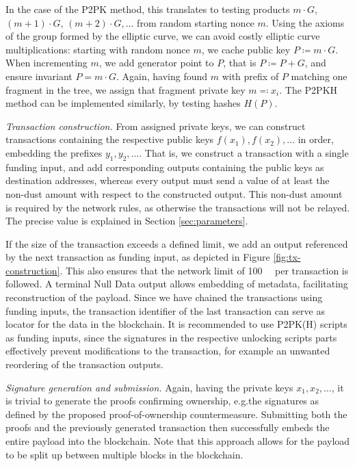 \documentclass[a4paper,11pt,titlepage]{scrbook}
\begin{document}
In the case of the P2PK method, this translates to testing products $m\cdot G$, $(m{+}1)\cdot G$, $(m{+}2)\cdot G,\dots$ from random starting nonce $m$.
Using the axioms of the group formed by the elliptic curve, we can avoid costly elliptic curve multiplications: starting with random nonce $m$, we cache public key $P\coloneqq m\cdot G$.
When incrementing $m$, we add generator point to $P$, that is $P\coloneqq P+G$, and ensure invariant $P= m\cdot G$.
Again, having found $m$ with prefix of $P$ matching one fragment in the tree, we assign that fragment private key $m\eqqcolon x_i$.
The P2PKH method can be implemented similarly, by testing hashes $H(P)$.

\emph{Transaction construction.}
From assigned private keys, we can construct transactions containing the respective public keys $f(x_1), f(x_2), \dots$ in order, embedding the prefixes $y_1, y_2, \dots$.
That is, we construct a transaction with a single funding input, and add corresponding outputs containing the public keys as destination addresses, whereas every output must send a value of at least the non-dust amount with respect to the constructed output.
This non-dust amount is required by the network rules, as otherwise the transactions will not be relayed.
The precise value is explained in Section \ref{sec:parameters}.

If the size of the transaction exceeds a defined limit, we add an output referenced by the next transaction as funding input, as depicted in Figure \ref{fig:tx-construction}.
This also ensures that the network limit of \SI{100}{\kilo\byte} per transaction is followed.
A terminal Null Data output allows embedding of metadata, facilitating reconstruction of the payload.
Since we have chained the transactions using funding inputs, the transaction identifier of the last transaction can serve as locator for the data in the blockchain.
It is recommended to use P2PK(H) scripts as funding inputs, since the signatures in the respective unlocking scripts parts effectively prevent modifications to the transaction, for example an unwanted reordering of the transaction outputs.

\emph{Signature generation and submission.}
Again, having the private keys $x_1, x_2, \dots$, it is trivial to generate the proofs confirming ownership, e.g.\@ the signatures as defined by the proposed proof-of-ownership countermeasure.
Submitting both the proofs and the previously generated transaction then successfully embeds the entire payload into the blockchain.
Note that this approach allows for the payload to be split up between multiple blocks in the blockchain.
\end{document}
